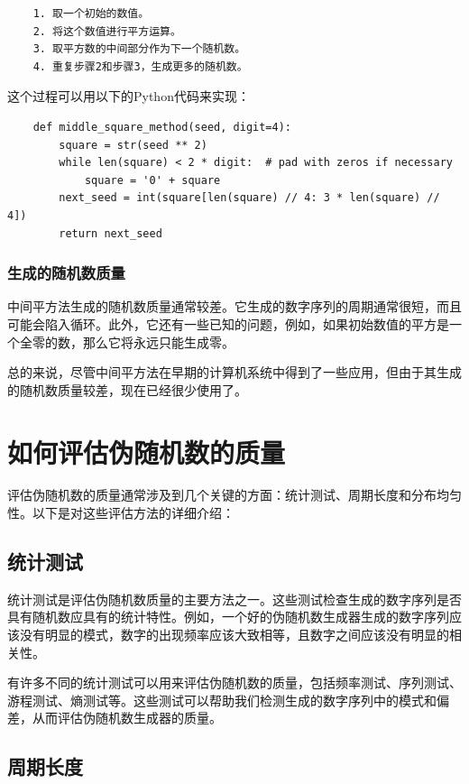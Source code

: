 \documentclass{ctexart}
\begin{document}
    \begin{lstlisting}
    1. 取一个初始的数值。
    2. 将这个数值进行平方运算。
    3. 取平方数的中间部分作为下一个随机数。
    4. 重复步骤2和步骤3，生成更多的随机数。
    \end{lstlisting}

    这个过程可以用以下的Python代码来实现：

    \begin{lstlisting}
    def middle_square_method(seed, digit=4):
        square = str(seed ** 2)
        while len(square) < 2 * digit:  # pad with zeros if necessary
            square = '0' + square
        next_seed = int(square[len(square) // 4: 3 * len(square) // 4])
        return next_seed
    \end{lstlisting}

    \subsubsection{生成的随机数质量}

    中间平方法生成的随机数质量通常较差。它生成的数字序列的周期通常很短，而且可能会陷入循环。此外，它还有一些已知的问题，例如，如果初始数值的平方是一个全零的数，那么它将永远只能生成零。

    总的来说，尽管中间平方法在早期的计算机系统中得到了一些应用，但由于其生成的随机数质量较差，现在已经很少使用了。

\section{如何评估伪随机数的质量}

评估伪随机数的质量通常涉及到几个关键的方面：统计测试、周期长度和分布均匀性。以下是对这些评估方法的详细介绍：

\subsection{统计测试}

统计测试是评估伪随机数质量的主要方法之一。这些测试检查生成的数字序列是否具有随机数应具有的统计特性。例如，一个好的伪随机数生成器生成的数字序列应该没有明显的模式，数字的出现频率应该大致相等，且数字之间应该没有明显的相关性\cite{knuth1981art}。

有许多不同的统计测试可以用来评估伪随机数的质量，包括频率测试、序列测试、游程测试、熵测试等。这些测试可以帮助我们检测生成的数字序列中的模式和偏差，从而评估伪随机数生成器的质量。

\subsection{周期长度}
\end{document}
